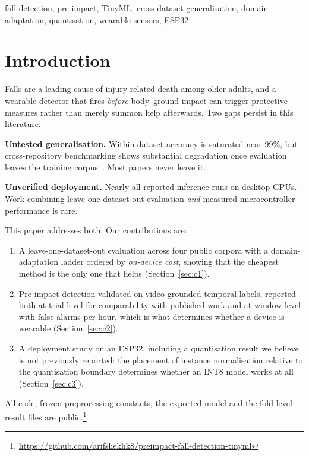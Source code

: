 \documentclass[conference]{IEEEtran}
\begin{document}
\begin{IEEEkeywords}
fall detection, pre-impact, TinyML, cross-dataset generalisation, domain adaptation,
quantisation, wearable sensors, ESP32
\end{IEEEkeywords}

\section{Introduction}

Falls are a leading cause of injury-related death among older adults, and a wearable
detector that fires \emph{before} body--ground impact can trigger protective measures
rather than merely summon help afterwards. Two gaps persist in this literature.

\textbf{Untested generalisation.} Within-dataset accuracy is saturated near 99\%, but
cross-repository benchmarking shows substantial degradation once evaluation leaves the
training corpus~\cite{silva2024crossdataset,casilari2017study}. Most papers never
leave it.

\textbf{Unverified deployment.} Nearly all reported inference runs on desktop GPUs.
Work combining leave-one-dataset-out evaluation \emph{and} measured microcontroller
performance is rare.

This paper addresses both. Our contributions are:

\begin{enumerate}
\item A leave-one-dataset-out evaluation across four public corpora with a
domain-adaptation ladder ordered by \emph{on-device cost}, showing that the cheapest
method is the only one that helps (Section~\ref{sec:c1}).
\item Pre-impact detection validated on video-grounded temporal labels, reported both
at trial level for comparability with published work and at window level with false
alarms per hour, which is what determines whether a device is wearable
(Section~\ref{sec:c2}).
\item A deployment study on an ESP32, including a quantisation result we believe is
not previously reported: the placement of instance normalisation relative to the
quantisation boundary determines whether an INT8 model works at all
(Section~\ref{sec:c3}).
\end{enumerate}

All code, frozen preprocessing constants, the exported model and the fold-level result
files are public.\footnote{\url{https://github.com/arifshekhk8/preimpact-fall-detection-tinyml}}
\end{document}
